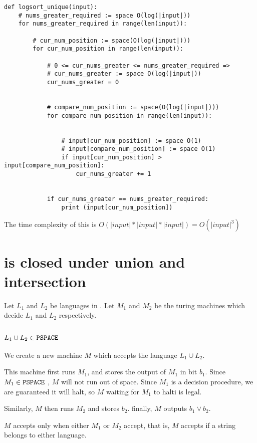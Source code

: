 \documentclass{article}
\begin{document}
\begin{verbatim}
def logsort_unique(input):
    # nums_greater_required := space O(log(|input|))
    for nums_greater_required in range(len(input)):

        # cur_num_position := space(O(log(|input|)))
        for cur_num_position in range(len(input)):

            # 0 <= cur_nums_greater <= nums_greater_required => 
            # cur_nums_greater := space O(log(|input|))
            cur_nums_greater = 0


            # compare_num_position := space(O(log(|input|)))
            for compare_num_position in range(len(input)):


                # input[cur_num_position] := space O(1)
                # input[compare_num_position] := space O(1)
                if input[cur_num_position] > input[compare_num_position]:
                    cur_nums_greater += 1


            if cur_nums_greater == nums_greater_required:
                print (input[cur_num_position])
\end{verbatim}

The time complexity of this is $O(|input| * |input| * |input|) = O(|input|^3)$



\section{\pspace is closed under union and intersection}
Let $L_1$ and $L_2$ be languages in \pspace. Let $M_1$ and $M_2$ be the
turing machines which decide $L_1$ and $L_2$ respectively.

\subsection{$L_1 \cup L_2 \in \texttt{PSPACE}~$}
We create a new machine $M$ which accepts the language $L_1 \cup L_2$.

This machine first runs $M_1$, and stores the output of $M_1$ in bit $b_1$.
Since $M_1 \in \texttt{PSPACE}~$, $M$ will not run out of space. Since $M_1$
is a decision procedure, we are guaranteed it will halt, so $M$
waiting for $M_1$ to halti is legal.

Similarly, $M$ then runs $M_2$ and stores $b_2$. finally, $M$ outputs
$b_1 \lor b_2$. 

$M$ accepts only when either $M_1$ or $M_2$ accept, that is, $M$ accepts
if a string belongs to either language.
\end{document}
